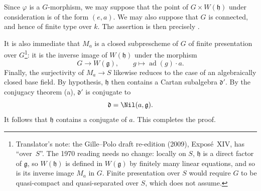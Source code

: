 Since \(\varphi\) is a \(G\)-morphism, we may suppose that the point
of \(G\times W(\mathfrak h)\) under consideration is of the form
\((e,a)\). We may also suppose that \(G\) is connected, and hence
of finite type over \(k\). The assertion is then precisely
.

It is also immediate that \(M_a\) is a closed subprescheme of \(G\)
of finite presentation over \(G\)\footnote{Translator's note: the Gille--Polo draft re-edition (2009), Exposé~XIV, has ``over~\(S\)''. The 1970 reading needs no change: locally on \(S\), \(\mathfrak h\) is a direct factor of \(\mathfrak g\), so \(W(\mathfrak h)\) is defined in \(W(\mathfrak g)\) by finitely many linear equations, and so is its inverse image \(M_a\) in \(G\). Finite presentation over \(S\) would require \(G\) to be quasi-compact and quasi-separated over \(S\), which  does not assume.}: it is the inverse image of
\(W(\mathfrak h)\) under the morphism
\[
  G\longrightarrow W(\mathfrak g),
  \qquad
  g\longmapsto\operatorname{ad}(g)\cdot a.
\]
Finally, the surjectivity of \(M_a\to S\) likewise reduces to the
case of an algebraically closed base field. By hypothesis,
\(\mathfrak h\) then contains a Cartan subalgebra
\(\mathfrak d'\). By the conjugacy theorem \textup{(a)},
\(\mathfrak d'\) is conjugate to
\[
  \mathfrak d=\Nil(a,\mathfrak g).
\]
It follows that \(\mathfrak h\) contains a conjugate of \(a\).
This completes the proof.
